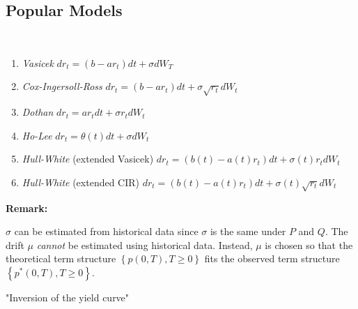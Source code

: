 \subsection{Popular Models}\hfill\\
\begin{enumerate}[leftmargin=*]
  \item\textit{Vasicek} $dr_t = (b-ar_t)dt+\sigma dW_T$
  \item\textit{Cox-Ingersoll-Ross} $dr_t = (b-ar_t)dt+\sigma\sqrt{r_t}dW_t$
  \item\textit{Dothan} $dr_t = ar_tdt+\sigma r_tdW_t$
  \item\textit{Ho-Lee} $dr_t = \theta(t)dt+\sigma dW_t$
  \item\textit{Hull-White} (extended Vasicek) $dr_t=(b(t)-a(t)r_t)dt+\sigma(t)r_t dW_t$
  \item\textit{Hull-White} (extended CIR) $dr_t = (b(t)-a(t)r_t)dt+\sigma(t)\sqrt{r_t}dW_t$
\end{enumerate}
\par\bigskip
\noindent\textbf{Remark:}\par
\noindent $\sigma$ can be estimated from historical data since $\sigma$ is the same under $P$ and $Q$. The drift $\mu$ \textit{cannot} be estimated using historical data. Instead, $\mu$ is chosen so that the theoretical term structure $\left\{p(0,T),T\geq0\right\}$ fits the observed term structure $\left\{p^*(0,T),T\geq0\right\}$.\par
\noindent"Inversion of the yield curve"
\par\bigskip
